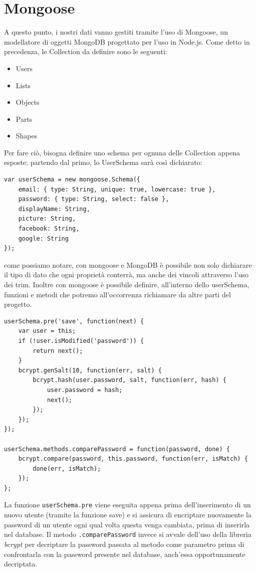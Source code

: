 \section{Mongoose}
A questo punto, i nostri dati vanno gestiti tramite l'uso di Mongoose, un modellatore di oggetti MongoDB progettato per l'uso in Node.js.
Come detto in precedenza, le Collection da definire sono le seguenti:
\begin{itemize}
	\item Users
	\item Lists
	\item Objects
	\item Parts
	\item Shapes
\end{itemize}

Per fare ciò, bisogna definire uno schema per ognuna delle Collection appena esposte; partendo dal primo, lo UserSchema sarà così dichiarato:

\begin{lstlisting}[caption={userSchema}, style=javaScriptCode]
var userSchema = new mongoose.Schema({
	email: { type: String, unique: true, lowercase: true },
	password: { type: String, select: false },
	displayName: String,
	picture: String,
	facebook: String,
	google: String
});
\end{lstlisting}

come possiamo notare, con mongoose e MongoDB è possibile non solo dichiarare il tipo di dato che ogni proprietà conterrà, ma anche dei vincoli attraverso l'uso dei trim.
Inoltre con mongoose è possibile definire, all'interno dello userSchema, funzioni e metodi che potremo all'occorrenza richiamare da altre parti del progetto.

\begin{lstlisting}[caption={userSchema}, style=javaScriptCode]
userSchema.pre('save', function(next) {
	var user = this;
	if (!user.isModified('password')) {
		return next();
	}
	bcrypt.genSalt(10, function(err, salt) {
		bcrypt.hash(user.password, salt, function(err, hash) {
			user.password = hash;
			next();
		});
	});
});

userSchema.methods.comparePassword = function(password, done) {
	bcrypt.compare(password, this.password, function(err, isMatch) {
		done(err, isMatch);
	});
};
\end{lstlisting}

La funzione \texttt{userSchema.pre} viene eseguita appena prima dell'inserimento di un nuovo utente (tramite la funzione save) e si assicura di encriptare nuovamente la password di un utente ogni qual volta questa venga cambiata, prima di inserirla nel database.
Il metodo \texttt{.comparePassword} invece si avvale dell'uso della libreria \emph{bcrypt} per decriptare la password passata al metodo come parametro prima di confrontarla con la password presente nel database, anch'essa opportunamente decriptata.

